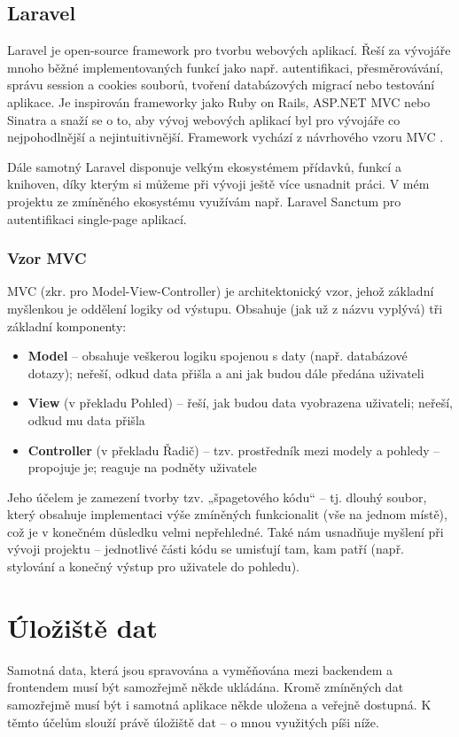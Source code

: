 	\subsection{Laravel}
	Laravel je open-source framework pro tvorbu webových aplikací. Řeší za vývojáře mnoho běžné implementovaných funkcí jako např. autentifikaci, přesměrovávání, správu session a cookies souborů, tvoření databázových migrací nebo testování aplikace. Je inspirován frameworky jako Ruby on Rails, ASP.NET MVC nebo Sinatra a snaží se o to, aby vývoj webových aplikací byl pro vývojáře co nejpohodlnější a nejintuitivnější. \cite{Laravel1} Framework vychází z návrhového vzoru MVC \cite{LaravelMVC}.
	
	Dále samotný Laravel disponuje velkým ekosystémem přídavků, funkcí a knihoven, díky kterým si můžeme při vývoji ještě více usnadnit práci. \cite{LaravelEco} V mém projektu ze zmíněného ekosystému využívám např. Laravel Sanctum pro autentifikaci single-page aplikací.
	
		\subsubsection{Vzor MVC}
		MVC (zkr. pro Model-View-Controller) je architektonický vzor, jehož základní myšlenkou je oddělení logiky od výstupu. Obsahuje (jak už z názvu vyplývá) tři základní komponenty:
		
		\begin{itemize}
			\item \textbf{Model} – obsahuje veškerou logiku spojenou s daty (např. databázové dotazy); neřeší, odkud data přišla a ani jak budou dále předána uživateli
			\item \textbf{View} (v překladu Pohled) – řeší, jak budou data vyobrazena uživateli; neřeší, odkud mu data přišla
			\item \textbf{Controller} (v překladu Řadič) – tzv. prostředník mezi modely a pohledy – propojuje je; reaguje na podněty uživatele
		\end{itemize}
	
		Jeho účelem je zamezení tvorby tzv. „špagetového kódu“ – tj. dlouhý soubor, který obsahuje implementaci výše zmíněných funkcionalit (vše na jednom místě), což je v konečném důsledku velmi nepřehledné. Také nám usnadňuje myšlení při vývoji projektu – jednotlivé části kódu se umisťují tam, kam patří (např. stylování a konečný výstup pro uživatele do pohledu). \cite{MVC}
		
\section{Úložiště dat}
Samotná data, která jsou spravována a vyměňována mezi backendem a frontendem musí být samozřejmě někde ukládána. Kromě zmíněných dat samozřejmě musí být i samotná aplikace někde uložena a veřejně dostupná. K těmto účelům slouží právě úložiště dat – o mnou využitých píši níže.

